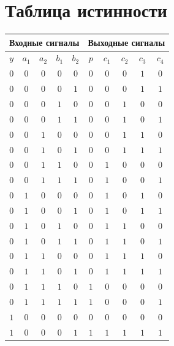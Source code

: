\documentclass[12pt,a4paper]{report}
\begin{document}
\section*{Таблица истинности}
\begin{tabular}{|c|cc|cc||c|cccc|}
    \hline
    \multicolumn{5}{|c||}{Входные сигналы} & \multicolumn{5}{c|}{Выходные сигналы}\\
    \hline
    $y$ & $a_1$ & $a_2$ & $b_1$ & $b_2$ & $p$ & $c_1$ & $c_2$ & $c_3$ & $c_4$\\
    \hline
    $0$ & $0$ & $0$ & $0$ & $0$ & $0$ & $0$ & $0$ & $1$ & $0$\\
    \hline
    $0$ & $0$ & $0$ & $0$ & $1$ & $0$ & $0$ & $0$ & $1$ & $1$\\
    \hline
    $0$ & $0$ & $0$ & $1$ & $0$ & $0$ & $0$ & $1$ & $0$ & $0$\\
    \hline
    $0$ & $0$ & $0$ & $1$ & $1$ & $0$ & $0$ & $1$ & $0$ & $1$\\
    \hline
    $0$ & $0$ & $1$ & $0$ & $0$ & $0$ & $0$ & $1$ & $1$ & $0$\\
    \hline
    $0$ & $0$ & $1$ & $0$ & $1$ & $0$ & $0$ & $1$ & $1$ & $1$\\
    \hline
    $0$ & $0$ & $1$ & $1$ & $0$ & $0$ & $1$ & $0$ & $0$ & $0$\\
    \hline
    $0$ & $0$ & $1$ & $1$ & $1$ & $0$ & $1$ & $0$ & $0$ & $1$\\
    \hline
    $0$ & $1$ & $0$ & $0$ & $0$ & $0$ & $1$ & $0$ & $1$ & $0$\\
    \hline
    $0$ & $1$ & $0$ & $0$ & $1$ & $0$ & $1$ & $0$ & $1$ & $1$\\
    \hline
    $0$ & $1$ & $0$ & $1$ & $0$ & $0$ & $1$ & $1$ & $0$ & $0$\\
    \hline
    $0$ & $1$ & $0$ & $1$ & $1$ & $0$ & $1$ & $1$ & $0$ & $1$\\
    \hline
    $0$ & $1$ & $1$ & $0$ & $0$ & $0$ & $1$ & $1$ & $1$ & $0$\\
    \hline
    $0$ & $1$ & $1$ & $0$ & $1$ & $0$ & $1$ & $1$ & $1$ & $1$\\
    \hline
    $0$ & $1$ & $1$ & $1$ & $0$ & $1$ & $0$ & $0$ & $0$ & $0$\\
    \hline
    $0$ & $1$ & $1$ & $1$ & $1$ & $1$ & $0$ & $0$ & $0$ & $1$\\
    \hline
    $1$ & $0$ & $0$ & $0$ & $0$ & $0$ & $0$ & $0$ & $0$ & $0$\\
    \hline
    $1$ & $0$ & $0$ & $0$ & $1$ & $1$ & $1$ & $1$ & $1$ & $1$\\

\end{tabular}
\end{document}
